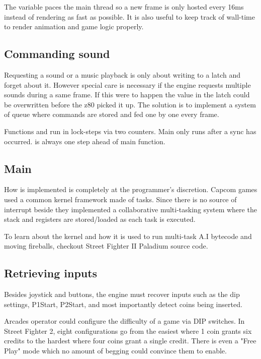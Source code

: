 \begin{trivia}
The  variable paces the main thread so a new frame is only hosted every 16ms instead of rendering as fast as possible. It is also useful to keep track of wall-time to render animation and game logic properly.
\end{trivia}


\subsection{Commanding sound}
Requesting a sound or a music playback is only about writing to a latch and forget about it. However special care is necessary if the engine requests multiple sounds during a same frame. If this were to happen the value in the latch could be overwritten before the z80 picked it up.
The solution is to implement a system of queue where commands are stored and fed one by one every frame. 

Functions  and  run in lock-steps via two counters. Main only runs after a sync has occurred.  is always one step ahead of main function.

 

\subsection{Main}
 


How  is implemented is completely at the programmer's discretion. Capcom games used a common kernel framework made of tasks. Since there is no source of interrupt beside  they implemented a collaborative multi-tasking system where the stack and registers are stored/loaded as each task is executed.

To learn about the kernel and how it is used to run multi-task A.I bytecode and moving fireballs, checkout Street Fighter II Paladium source code\cite{sf2platinium}.

\subsection{Retrieving inputs}
Besides joystick and buttons, the engine must recover inputs such as the dip settings, P1Start, P2Start, and most importantly detect coins being inserted.

\begin{trivia}
Arcades operator could configure the difficulty of a game via DIP switches. In Street Fighter 2, eight configurations go from the easiest where 1 coin grants six credits to the hardest where four coins grant a single credit. There is even a "Free Play" mode which no amount of begging could convince them to enable\cite{sf2manual}.
\end{trivia}

